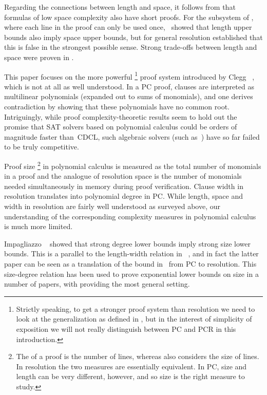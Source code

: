 Regarding the connections between length and space,
it follows from
\cite{AD08CombinatoricalCharacterization}
that formulas of low space complexity also have short proofs.
For the subsystem of ,
where each line in the proof can only be used once,
\cite{ET01SpaceBounds}~showed 
%
that length upper bounds also imply space upper bounds,
but for general resolution
\cite{BN08ShortProofs} established that this is false in the
strongest possible sense. 
%
Strong trade-offs between length and space were proven in
\cite{BN11UnderstandingSpace,BBI16TimeSpace}.

This paper focuses on the more powerful
%
%
\footnote{Strictly speaking, to get a stronger proof system than
  resolution we need to look at the generalization
%
%
  as defined in
  \cite{ABRW02SpaceComplexity},
%
%
  but in the interest of simplicity of exposition we will not really
  distinguish between PC and PCR in this introduction.
}
proof system introduced by Clegg \etal~\cite{CEI96Groebner},
which is not at all as well understood.
In a PC proof, clauses are interpreted as multilinear polynomials
(expanded out to sums of monomials),
and one derives contradiction by showing that these polynomials have
no common root. 
%
Intriguingly, while proof complexity-theoretic results seem to hold
out the promise that SAT solvers based on 
%
%
polynomial calculus could be orders of
magnitude faster than~CDCL, such algebraic solvers 
%
(such as~\cite{BD09Polybori})
have so far failed to be truly competitive.

Proof size%
\footnote{The  of a proof is the
  number of lines, whereas  also   considers 
  the size of lines. In resolution the two measures are
  essentially equivalent. In PC, %
  size and length can be
  very different, however, and so size is the right measure to study.}
in 
%
polynomial calculus   
is measured as the total number of monomials in a proof
and the analogue of resolution space is the number of monomials needed 
%
simultaneously in memory during
proof verification. Clause width in resolution
translates into polynomial degree in PC.
While length, space and width in resolution are fairly well
understood as surveyed above,
our understanding of the corresponding
complexity measures in 
%
polynomial calculus is much more limited.

Impagliazzo \etal~\cite{IPS99LowerBounds}
showed that strong degree lower bounds imply strong size lower bounds.
This is a parallel to the length-width relation 
%
in~%
\cite{BW01ShortProofs},
and in fact the latter paper can be seen as a 
translation of   the bound in~%
\cite{IPS99LowerBounds} from
PC 
%
to resolution.
This size-degree relation has been used to prove exponential lower
bounds on  size in a number of papers, with
%
\cite{AR03LowerBounds,MN15GeneralizedMethodDegree}
%
providing the most general setting.

